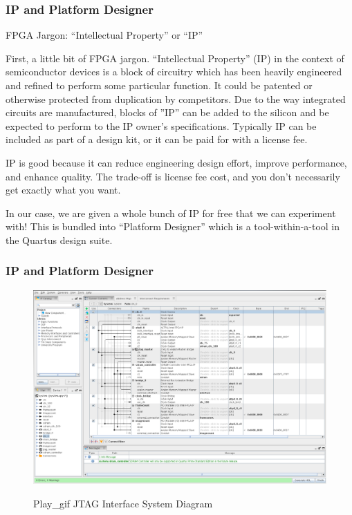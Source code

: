 \documentclass{beamer}
\begin{document}
\begin{frame}
\frametitle{IP and Platform Designer}

FPGA Jargon:  ``Intellectual Property'' or ``IP''

First, a little bit of FPGA jargon.  ``Intellectual Property'' (IP) in the context of semiconductor devices is a block of circuitry which has been heavily engineered and refined to perform some particular function.  It could be patented or otherwise protected from duplication by competitors.
Due to the way integrated circuits are manufactured, blocks of ''IP'' can be added to the silicon and be expected to perform to the IP owner's specifications.  Typically IP can be included as part of a design kit, or it can be paid for with a license fee.

IP is good because it can reduce engineering design effort, improve performance, and enhance quality.  The trade-off is license fee cost, and you don't necessarily get exactly what you want.

In our case, we are given a whole bunch of IP for free that we can experiment with!  This is bundled into ``Platform Designer'' which is a tool-within-a-tool in the Quartus design suite.

\end{frame}

\begin{frame}
\frametitle{IP and Platform Designer}

\begin{figure}[h]
	\centering
	\includegraphics[width=1.0\textwidth]{graphics/platform_designer.pdf}
	\centering\bfseries
	\caption{Play\_gif JTAG Interface System Diagram}
\end{figure}

\end{frame}
\end{document}

